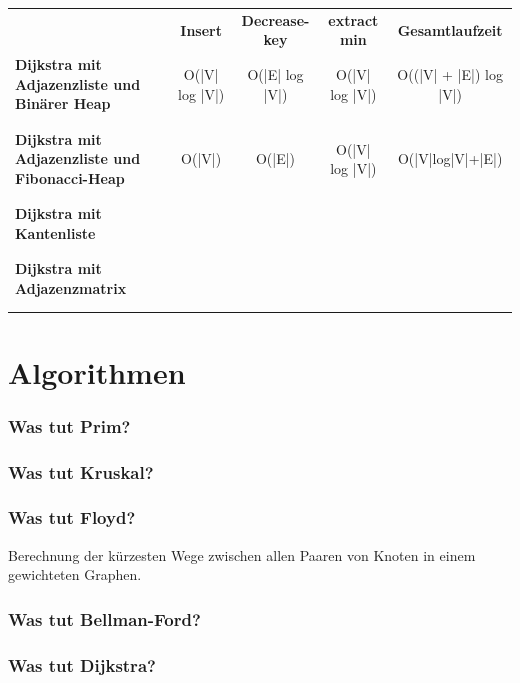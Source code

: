 \documentclass{article}
\begin{document}
\begin{table}[H]
    \begin{tabular}{ p{5cm} | c c c c }
         & \textbf{Insert} & \textbf{Decrease-key} & \textbf{extract min}  & \textbf{Gesamtlaufzeit} \\
        \textbf{Dijkstra mit Adjazenzliste und Binärer Heap} & O(|V| log |V|)     & O(|E| log |V|) &  O(|V| log |V|) & O((|V| + |E|) log |V|) \\ \\ \\
        \textbf{Dijkstra mit Adjazenzliste und Fibonacci-Heap} & O(|V|)  &  O(|E|) & O(|V| log |V|) & O(|V|log|V|+|E|) \\ \\ \\
        \textbf{Dijkstra mit Kantenliste} &  & &  \\ \\ \\
        \textbf{Dijkstra mit Adjazenzmatrix} & & & \\ \\ \\
    \end{tabular}
    \label{tab:my_label}   
\end{table}

\section{Algorithmen}
\subsubsection*{Was tut Prim?} 
\bigskip \bigskip
\subsubsection*{Was tut Kruskal?} 
\bigskip \bigskip
\subsubsection*{Was tut Floyd?} 
Berechnung der kürzesten Wege zwischen allen Paaren von Knoten in einem gewichteten Graphen.
\subsubsection*{Was tut Bellman-Ford?} 
\bigskip \bigskip
\subsubsection*{Was tut Dijkstra?} 
\bigskip \bigskip
\end{document}
